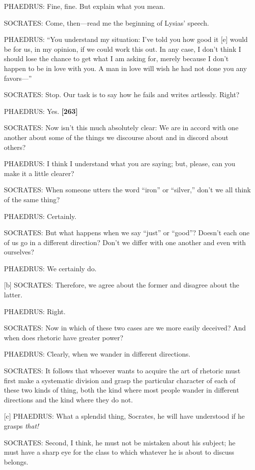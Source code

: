 PHAEDRUS: Fine, fine. But explain what you mean.

SOCRATES: Come, then---read me the beginning of Lysias' speech.

PHAEDRUS: “You understand my situation: I've told you how good it
{[}e{]} would be for us, in my opinion, if we could work this out. In
any case, I don't think I should lose the chance to get what I am asking
for, merely because I don't happen to be in love with you. A man in love
will wish he had not done you any favors---”

SOCRATES: Stop. Our task is to say how he fails and writes artlessly.
Right?

PHAEDRUS: Yes. {\bf {[}263{]}}

SOCRATES: Now isn't this much absolutely clear: We are in accord with
one another about some of the things we discourse about and in discord
about others?

PHAEDRUS: I think I understand what you are saying; but, please, can you
make it a little clearer?

SOCRATES: When someone utters the word “iron” or “silver,” don't we all
think of the same thing?

PHAEDRUS: Certainly.

SOCRATES: But what happens when we say “just” or “good”? Doesn't each
one of us go in a different direction? Don't we differ with one another
and even with ourselves?

PHAEDRUS: We certainly do.

{[}b{]} SOCRATES: Therefore, we agree about the former and disagree
about the latter.

PHAEDRUS: Right.

SOCRATES: Now in which of these two cases are we more easily deceived?
And when does rhetoric have greater power?

PHAEDRUS: Clearly, when we wander in different directions.

SOCRATES: It follows that whoever wants to acquire the art of rhetoric
must first make a systematic division and grasp the particular character
of each of these two kinds of thing, both the kind where most people
wander in different directions and the kind where they do not.

{[}c{]} PHAEDRUS: What a splendid thing, Socrates, he will have
understood if he grasps {\em that!}

SOCRATES: Second, I think, he must not be mistaken about his subject; he
must have a sharp eye for the class to which whatever he is about to
discuss belongs.


